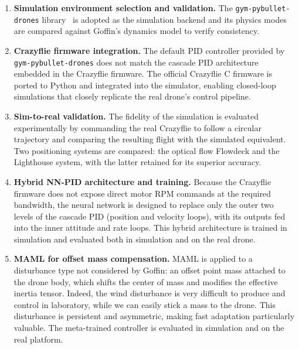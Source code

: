 \documentclass[11pt,a4paper]{article}
\theoremstyle{remark}
\numberwithin{equation}{section}
\begin{document}
\begin{enumerate}

    \item \textbf{Simulation environment selection and validation.}
    The \texttt{gym-pybullet-drones} library~\cite{panerati2021} is adopted as the
    simulation backend and its physics modes are compared against Goffin's dynamics model
    to verify consistency.

    \item \textbf{Crazyflie firmware integration.}
    The default PID controller provided by \texttt{gym-pybullet-drones} does not match
    the cascade PID architecture embedded in the Crazyflie firmware. The official
    Crazyflie C firmware is ported to Python and integrated into the simulator, enabling
    closed-loop simulations that closely replicate the real drone's control pipeline.

    \item \textbf{Sim-to-real validation.}
    The fidelity of the simulation is evaluated experimentally by commanding the real
    Crazyflie to follow a circular trajectory and comparing the resulting flight with the
    simulated equivalent. Two positioning systems are compared: the optical flow Flowdeck
    and the Lighthouse system, with the latter retained for its superior accuracy.

    \item \textbf{Hybrid NN-PID architecture and training.}
    Because the Crazyflie firmware does not expose direct motor RPM commands at the
    required bandwidth, the neural network is designed to replace only the outer two levels
    of the cascade PID (position and velocity loops), with its outputs fed into the inner
    attitude and rate loops. This hybrid architecture is trained in simulation and
    evaluated both in simulation and on the real drone.

    \item \textbf{MAML for offset mass compensation.}
    MAML is applied to a disturbance type not considered by Goffin: an offset point mass
    attached to the drone body, which shifts the center of mass and modifies the effective
    inertia tensor. Indeed, the wind disturbance is very difficult to produce and control in
    laboratory, while we can easily stick a mass to the drone. This disturbance is persistent
    and asymmetric, making fast adaptation particularly valuable. The meta-trained controller
    is evaluated in simulation and on the real platform.

\end{enumerate}
\end{document}
